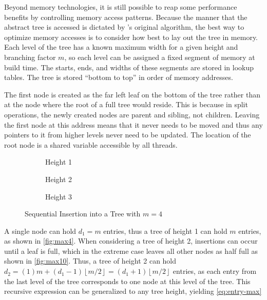 Beyond memory technologies, it is still possible to reap some performance
benefits by controlling memory access patterns. Because the manner that the
abstract tree is accessed is dictated by \citeauthor{b-link}'s original
algorithm, the best way to optimize memory accesses is to consider how best to
lay out the tree in memory.
%
Each level of the tree has a known maximum width for a given height and
branching factor $m$, so each level can be assigned a fixed segment of memory at
build time. The starts, ends, and widths of these segments are stored in lookup
tables. The tree is stored ``bottom to top'' in order of memory addresses.

The first node is created as the far left leaf on the bottom of the tree rather
than at the node where the root of a full tree would reside. This is because in
split operations, the newly created nodes are parent and sibling, not children.
Leaving the first node at this address means that it never needs to be moved and
thus any pointers to it from higher levels never need to be updated. The
location of the root node is a shared variable accessible by all threads.

\begin{figure}[h]
	\centering
	\begin{subfigure}{6em}
		\centering
		
		\caption{Height 1}
		\label{fig:max4}
	\end{subfigure}
	\begin{subfigure}{15em}
		\centering
		
		\caption{Height 2}
		\label{fig:max10}
	\end{subfigure}
	\begin{subfigure}{\textwidth}
		\centering
		
		\caption{Height 3}
		\label{fig:max22}
	\end{subfigure}
	\caption{Sequential Insertion into a Tree with $m=4$}
	\label{fig:sequential-insertion}
\end{figure}

A single node can hold $d_1=m$ entries, thus a tree of height 1 can hold $m$
entries, as shown in \autoref{fig:max4}. When considering a tree of height 2,
insertions can occur until a leaf is full, which in the extreme case leaves all
other nodes as half full as shown in \autoref{fig:max10}. Thus, a tree of height
2 can hold $d_2 = (1)m + (d_1-1)\left\lfloor{m/2}\right\rfloor =
(d_1+1)\left\lfloor{m/2}\right\rfloor$ entries, as each entry from the last
level of the tree corresponds to one node at this level of the tree.
%
This recursive expression can be generalized to any tree height, yielding
\autoref{eq:entry-max}

